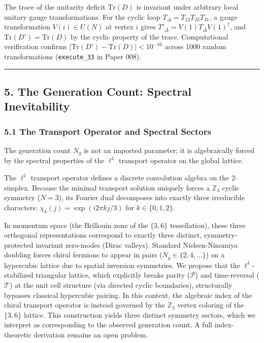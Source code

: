 \documentclass[
]{article}
\begin{document}
The trace of the unitarity deficit \(\mathrm{Tr}(D)\) is invariant under
arbitrary local unitary gauge transformations. For the cyclic loop
\(T_\Delta = T_{12} T_{23} T_{31}\), a gauge transformation
\(V(i) \in U(N)\) at vertex \(i\) gives
\(T'_\Delta = V(1) T_\Delta V(1)^\dagger\), and
\(\mathrm{Tr}(D') = \mathrm{Tr}(D)\) by the cyclic property of the
trace. Computational verification confirms
\(|\mathrm{Tr}(D') - \mathrm{Tr}(D)| < 10^{-10}\) across 1000 random
transformations (\texttt{execute\_33} in Paper 008).

\begin{center}\rule{0.5\linewidth}{0.5pt}\end{center}

\hypertarget{the-generation-count-spectral-inevitability}{%
\subsection{5. The Generation Count: Spectral
Inevitability}\label{the-generation-count-spectral-inevitability}}

\hypertarget{the-transport-operator-and-spectral-sectors}{%
\subsubsection{5.1 The Transport Operator and Spectral
Sectors}\label{the-transport-operator-and-spectral-sectors}}

The generation count \(N_g\) is not an imported parameter; it is
algebraically forced by the spectral properties of the \(\ell^1\)
transport operator on the global lattice.

The \(\ell^1\) transport operator defines a discrete convolution algebra
on the 2-simplex. Because the minimal transport solution uniquely forces
a \(\mathbb{Z}_3\) cyclic symmetry (\(N=3\)), its Fourier dual
decomposes into exactly three irreducible characters:
\(\chi_k(j) = \exp(i 2\pi k j / 3)\) for \(k \in \{0, 1, 2\}\).

In momentum space (the Brillouin zone of the \(\{3,6\}\) tessellation),
these three orthogonal representations correspond to exactly three
distinct, symmetry-protected invariant zero-modes (Dirac valleys).
Standard Nielsen-Ninomiya doubling forces chiral fermions to appear in
pairs (\(N_g \in \{2, 4, ...\}\)) on a hypercubic lattice due to spatial
inversion symmetries. We propose that the \(\ell^1\)-stabilized
triangular lattice, which explicitly breaks parity (\(\mathcal{P}\)) and
time-reversal (\(\mathcal{T}\)) at the unit cell structure (via directed
cyclic boundaries), structurally bypasses classical hypercubic pairing.
In this context, the algebraic index of the chiral transport operator is
instead governed by the \(\mathbb{Z}_3\) vertex coloring of the
\(\{3,6\}\) lattice. This construction yields three distinct symmetry
sectors, which we interpret as corresponding to the observed generation
count. A full index-theoretic derivation remains an open problem.
\end{document}
